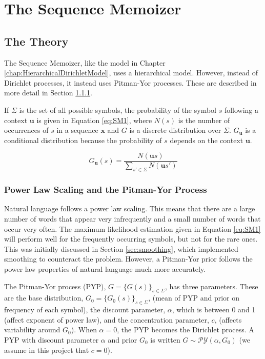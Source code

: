 \chapter{The Sequence Memoizer} \label{chap:seqMem}


\section{The Theory}

The Sequence Memoizer, like the model in Chapter \ref{chap:HierarchicalDirichletModel}, uses a hierarchical model. However, instead of Dirichlet processes, it instead uses Pitman-Yor processes. These are described in more detail in Section \ref{sec:PitmanYor}.

If $\Sigma$ is the set of all possible symbols, the probability of the symbol $s$ following a context $\boldsymbol{u}$ is given in Equation \ref{eq:SM1}, where $N(s)$ is the number of occurrences of $s$ in a sequence $\boldsymbol{x}$ and $G$ is a discrete distribution over $\Sigma$. $G_{\boldsymbol{u}}$ is a conditional distribution because the probability of $s$ depends on the context $\boldsymbol{u}$.

\begin{equation}
G_{\boldsymbol{u}}(s)=\frac{N(\boldsymbol{u}s)}{\sum_{s' \in \Sigma}N(\boldsymbol{u}s')}
\label{eq:SM1}
\end{equation}

\subsection{Power Law Scaling and the Pitman-Yor Process}\label{sec:PitmanYor}

Natural language follows a power law scaling. This means that there are a large number of words that appear very infrequently and a small number of words that occur very often. The maximum likelihood estimation given in Equation \ref{eq:SM1} will perform well for the frequently occurring symbols, but not for the rare ones. This was initially discussed in Section \ref{sec:smoothing}, which implemented smoothing to counteract the problem. However, a Pitman-Yor prior follows the power law properties of natural language much more accurately.

The Pitman-Yor process (PYP), $G=\{G(s)\}_{s\in\Sigma}$, has three parameters. These are the base distribution, $G_{0}=\{G_{0}(s)\}_{s\in\Sigma}$, (mean of PYP and prior on frequency of each symbol), the discount parameter, $\alpha$, which is between 0 and 1 (affect exponent of power law), and the concentration parameter, $c$, (affects variability around $G_{0}$). When $\alpha=0$, the PYP becomes the Dirichlet process. A PYP with discount parameter $\alpha$ and prior $G_{0}$ is written $G\sim\mathcal{PY}(\alpha,G_{0})$ (we assume in this project that $c=0$).



